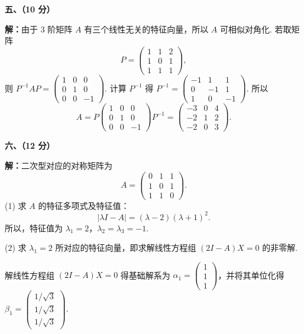 \documentclass[a4paper,11pt]{ctexart}
\begin{document}
\textbf{五、（10 分）}

\textbf{解：}由于 $3$ 阶矩阵 $A$ 有三个线性无关的特征向量，所以 $A$ 可相似对角化. 若取矩阵
\[
  P = \begin{pmatrix}
    1 & 1 & 2 \\
    1 & 0 & 1 \\
    1 & 1 & 1
  \end{pmatrix},
\]
则 $P^{-1} A P = \begin{pmatrix} 1 & 0 & 0 \\ 0 & 1 & 0 \\ 0 & 0 & -1 \end{pmatrix}$. 计算 $P^{-1}$ 得 $P^{-1} = \begin{pmatrix} -1 & 1 & 1 \\ 0 & -1 & 1 \\ 1 & 0 & -1 \end{pmatrix}$. 所以
\[
  A = P \begin{pmatrix} 1 & 0 & 0 \\ 0 & 1 & 0 \\ 0 & 0 & -1 \end{pmatrix} P^{-1}
  = \begin{pmatrix}
    -3 & 0 & 4 \\
    -2 & 1 & 2 \\
    -2 & 0 & 3
  \end{pmatrix}.
\]

\vspace{0.8em}

\textbf{六、（12 分）}

\textbf{解：}二次型对应的对称矩阵为
\[
  A = \begin{pmatrix}
    0 & 1 & 1 \\
    1 & 0 & 1 \\
    1 & 1 & 0
  \end{pmatrix}.
\]
(1) 求 $A$ 的特征多项式及特征值：
\[
  |\lambda I - A| = (\lambda - 2)(\lambda + 1)^2.
\]
所以，特征值为 $\lambda_1 = 2$，$\lambda_2 = \lambda_3 = -1$.

(2) 求 $\lambda_1 = 2$ 所对应的特征向量，即求解线性方程组 $(2I - A)X = 0$ 的非零解.

解线性方程组 $(2I - A)X = 0$ 得基础解系为 $\alpha_1 = \begin{pmatrix} 1 \\ 1 \\ 1 \end{pmatrix}$，并将其单位化得 $\beta_1 = \begin{pmatrix} 1/\sqrt{3} \\ 1/\sqrt{3} \\ 1/\sqrt{3} \end{pmatrix}$.
\end{document}
